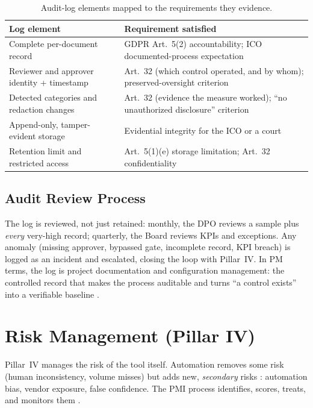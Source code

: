 \documentclass[12pt,a4paper]{article}
\begin{document}
\begin{table}[H]
\centering
\small
{}
\begin{tabular}{@{} p{6.0cm} p{8.0cm} @{}}
\toprule
\textbf{\color{accentdark}Log element} & \textbf{\color{accentdark}Requirement satisfied} \\
\midrule
Complete per-document record & GDPR Art.~5(2) accountability; ICO documented-process expectation \\
Reviewer and approver identity + timestamp & Art.~32 (which control operated, and by whom); preserved-oversight criterion \\
Detected categories and redaction changes & Art.~32 (evidence the measure worked); ``no unauthorized disclosure'' criterion \\
Append-only, tamper-evident storage & Evidential integrity for the ICO or a court \\
Retention limit and restricted access & Art.~5(1)(e) storage limitation; Art.~32 confidentiality \\
\bottomrule
\end{tabular}
\caption{Audit-log elements mapped to the requirements they evidence.}
\label{tab:compliance}
\end{table}

\subsection{Audit Review Process}

The log is reviewed, not just retained: monthly, the DPO reviews a sample plus \emph{every} very-high record; quarterly, the Board reviews KPIs and exceptions. Any anomaly (missing approver, bypassed gate, incomplete record, KPI breach) is logged as an incident and escalated, closing the loop with Pillar~IV. In PM terms, the log is project documentation and configuration management: the controlled record that makes the process auditable and turns ``a control exists'' into a verifiable baseline \cite{falchi_slides}.

\section{Risk Management (Pillar IV)}
\label{sec:risk}

Pillar~IV manages the risk of the tool itself. Automation removes some risk (human inconsistency, volume misses) but adds new, \emph{secondary} risks \cite{falchi_slides}: automation bias, vendor exposure, false confidence. The PMI process identifies, scores, treats, and monitors them \cite{falchi_slides}.
\end{document}
